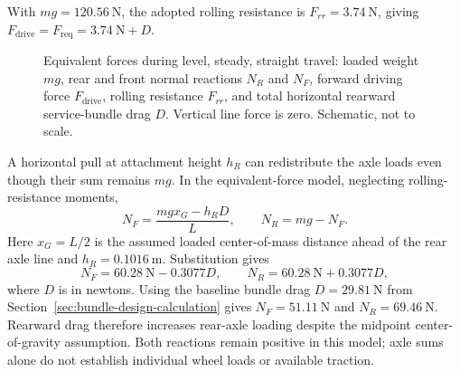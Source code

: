 With $mg=120.56~\mathrm{N}$, the adopted rolling resistance is $F_{rr}=3.74~\mathrm{N}$, giving $F_{\mathrm{drive}}=F_{\mathrm{req}}=3.74~\mathrm{N}+D$.
\begin{figure}[htbp]
\centering
{}
\caption[Level-floor crawler force model]{Equivalent forces during level, steady, straight travel: loaded weight $mg$, rear and front normal reactions $N_R$ and $N_F$, forward driving force $F_{\mathrm{drive}}$, rolling resistance $F_{rr}$, and total horizontal rearward service-bundle drag $D$. Vertical line force is zero. Schematic, not to scale.}
\label{fig:crawler-force-diagram}
\end{figure}

A horizontal pull at attachment height $h_R$ can redistribute the axle loads even though their sum remains $mg$. In the equivalent-force model, neglecting rolling-resistance moments,
\begin{equation}
 N_F=\frac{mgx_G-h_RD}{L}, \qquad N_R=mg-N_F.
 \label{eq:crawler-axle-loads}
\end{equation}
Here $x_G=L/2$ is the assumed loaded center-of-mass distance ahead of the rear axle line and $h_R=0.1016~\mathrm{m}$. Substitution gives
\begin{equation}
 N_F=60.28~\mathrm{N}-0.3077D,\qquad
 N_R=60.28~\mathrm{N}+0.3077D,
\end{equation}
where $D$ is in newtons. Using the baseline bundle drag $D=29.81~\mathrm{N}$ from Section~\ref{sec:bundle-design-calculation} gives $N_F=51.11~\mathrm{N}$ and $N_R=69.46~\mathrm{N}$. Rearward drag therefore increases rear-axle loading despite the midpoint center-of-gravity assumption. Both reactions remain positive in this model; axle sums alone do not establish individual wheel loads or available traction.

